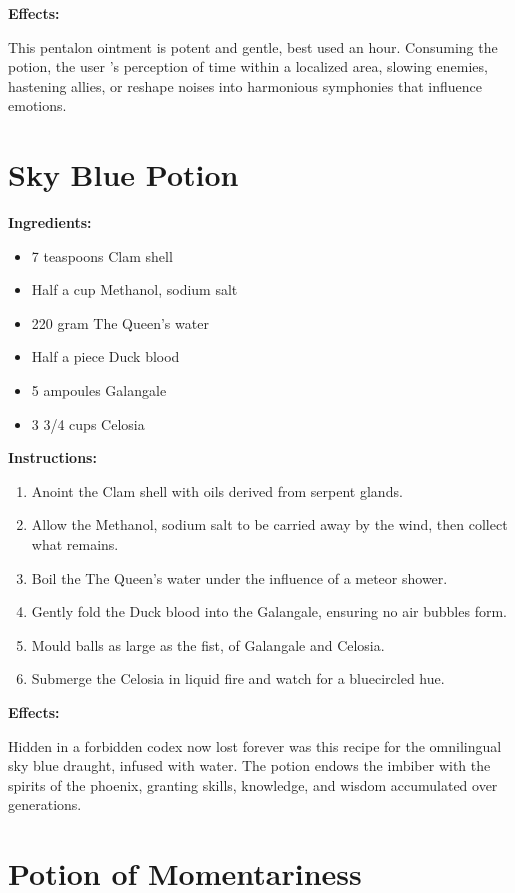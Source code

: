 \documentclass{article}
\begin{document}
\textbf{Effects:}

This pentalon ointment is potent and gentle, best used an hour. Consuming the potion, the user 's perception of time within a localized area, slowing enemies, hastening allies, or reshape noises into harmonious symphonies that influence emotions.

\newpage
\section*{Sky Blue Potion}

\textbf{Ingredients:}

\begin{itemize}
  \item 7 teaspoons Clam shell
  \item Half a cup Methanol, sodium salt
  \item 220 gram The Queen's water
  \item Half a piece Duck blood
  \item 5 ampoules Galangale
  \item 3 3/4 cups Celosia
\end{itemize}

\textbf{Instructions:}

\begin{enumerate}
  \item Anoint the Clam shell with oils derived from serpent glands.
  \item Allow the Methanol, sodium salt to be carried away by the wind, then collect what remains.
  \item Boil the The Queen's water under the influence of a meteor shower.
  \item Gently fold the Duck blood into the Galangale, ensuring no air bubbles form.
  \item Mould balls as large as the fist, of Galangale and Celosia.
  \item Submerge the Celosia in liquid fire and watch for a bluecircled hue.
\end{enumerate}

\textbf{Effects:}

Hidden in a forbidden codex now lost forever was this recipe for the omnilingual sky blue draught, infused with water. The potion endows the imbiber with the spirits of the phoenix, granting skills, knowledge, and wisdom accumulated over generations.

\newpage
\section*{Potion of Momentariness}
\end{document}
